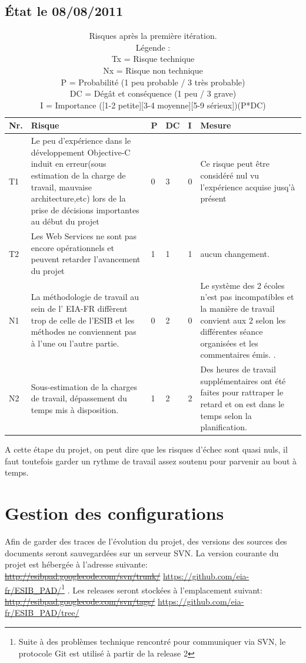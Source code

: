 	\subsection{État le 08/08/2011  }
	\begin{table}[H]
	\begin{tabular}{|l|p{6cm}|l|l|l|p{6cm}|}
		\hline  Nr. & Risque & P  & DC & I & Mesure \\ 
		\hline  {\color{green}T1} & Le peu d'expérience dans le développement \gls{Objective-C} induit en erreur(sous estimation de la charge de travail, mauvaise architecture,etc) lors de la prise de décisions importantes au début du projet &0 & 3 & 0 & Ce risque peut être considéré nul vu l'expérience acquise jusq'à présent   \\ 
		\hline  {\color{green}T2} & Les Web Services ne sont pas encore opérationnels et peuvent retarder l'avancement du projet & 1 & 1 & 1 & aucun changement.  \\ 
		\hline  \color{green}N1 & La méthodologie de travail au sein de l' \gls{EIA-FR} diffèrent trop de celle de l'\gls{ESIB}  et les méthodes ne conviennent pas à l'une ou l'autre partie.  & 0 & 2 & 0 & Le système des 2 écoles n'est pas incompatibles et la manière de travail convient aux 2 selon les différentes séance organisées et les commentaires émis. .  \\ 
		\hline  {\color{green}N2} & Sous-estimation de la charges de travail, dépassement du temps mis à disposition.  & 1 & 2 & 2 & Des heures de travail supplémentaires ont été faites pour rattraper le retard et on est dans le temps selon la planification.  \\ 
		\hline 
	\end{tabular} 
	\caption{ Risques après la première itération.\\ Légende :\\
Tx = Risque technique\\
Nx = Risque non technique\\
P = Probabilité  (1 peu probable / 3 très probable)\\ 
DC = Dégât et conséquence (1 peu / 3 grave)\\
I =  Importance ([1-2 petite][3-4 moyenne][5-9 sérieux])(P*DC)
}
	\end{table}
A cette étape du projet, on peut dire que les risques d'échec sont quasi nuls, il faut toutefois garder un rythme de travail assez soutenu pour parvenir au bout à temps.  

\section{Gestion des configurations}
Afin de garder des traces de l'évolution du projet, des versions des sources des documents seront sauvegardées sur un serveur \gls{SVN}. La version courante du projet est hébergée à l'adresse suivante:  \sout{\url{http://esibpad.googlecode.com/svn/trunk/}} \url{https://github.com/eia-fr/ESIB_PAD/}\footnote{Suite à des problèmes technique rencontré pour communiquer via SVN, le protocole \gls{Git} est utilisé à partir de la release 2} . Les releases seront stockées  à l'emplacement suivant: \sout{\url{http://esibpad.googlecode.com/svn/tags/}} \url{ https://github.com/eia-fr/ESIB_PAD/tree/} 

